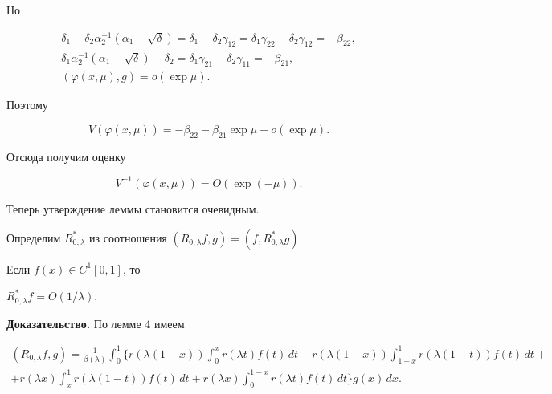 Но


\begin{gather*}


\delta_1-\delta_2\alpha_2^{-1}(\alpha_1-\sqrt\delta)=


\delta_1-\delta_2\gamma_{12}=\delta_1\gamma_{22}-\delta_2\gamma_{12}=


-\beta_{22}, \\


\delta_1\alpha_2^{-1}(\alpha_1-\sqrt\delta)-\delta_2=\delta_1


\gamma_{21}-\delta_2\gamma_{11}=-\beta_{21},\\


(\varphi(x,\mu),g)=o(\exp\mu).


\end{gather*}


Поэтому


$$


V(\varphi(x,\mu))=-\beta_{22}-\beta_{21}\exp\mu+o(\exp\mu).


$$


Отсюда получим оценку


$$


V^{-1}(\varphi(x,\mu))=O(\exp(-\mu)).


$$


Теперь утверждение леммы становится очевидным.


\medskip





Определим $R_{0,\lambda}^*$ из соотношения $(R_{0,\lambda}f,g)=


(f,R_{0,\lambda}^*g)$.





\begin{lem}


Если $f(x)\in C^1[0,1]$, то


$R_{0,\lambda}^*f=O(1/\lambda)$.


\end{lem}





{\bf Доказательство.} По лемме 4 имеем


\begin{multline}


(R_{0,\lambda}f,g)=\frac1{\beta(\lambda)}\int_0^1\bigg\{


r(\lambda(1-x))\int_0^xr(\lambda t)f(t)\, dt+


r(\lambda(1-x))\int_{1-x}^1r(\lambda(1-t))f(t)\, dt+ \\


%


+r(\lambda x)\int_x^1r(\lambda(1-t))f(t)\, dt+


r(\lambda x)\int_0^{1-x}r(\lambda t)f(t)\, dt


\bigg\}g(x)\, dx.


\end{multline}


